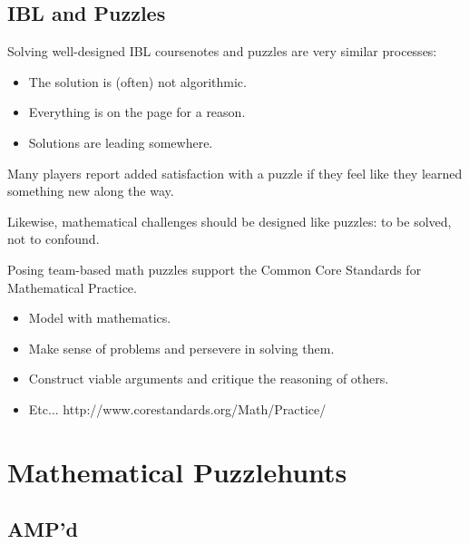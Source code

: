 \documentclass{beamer}
\theoremstyle{theorem}
\theoremstyle{definition}
\newcommand{\<}{\langle}
\renewcommand{\>}{\rangle}
\newcommand{\vpause}{\pause\vspace{1em}}
\begin{document}
\subsection{IBL and Puzzles}

\begin{frame}
  Solving well-designed IBL coursenotes and puzzles
  are very similar processes:

  \pause

  \begin{itemize}
    \item The solution is (often) not algorithmic.
    \pause
    \item Everything is on the page for a reason.
    \pause
    \item Solutions are leading somewhere.
  \end{itemize}
\end{frame}

\begin{frame}
  Many players report added satisfaction with a puzzle if they feel like they
  learned something new along the way.

  \vpause

  Likewise, mathematical challenges should be designed like
  puzzles: to be solved, not to confound.
\end{frame}

\begin{frame}
  Posing team-based math puzzles support the
  Common Core Standards for Mathematical Practice.

  \pause

  \begin{itemize}
    \item Model with mathematics.
    \pause
    \item Make sense of problems and persevere in solving them.
    \pause
    \item Construct viable arguments and critique the reasoning of others.
    \pause
    \item Etc...
          http://www.corestandards.org/Math/Practice/
  \end{itemize}
\end{frame}

\section{Mathematical Puzzlehunts}

\subsection{AMP'd}
\end{document}

